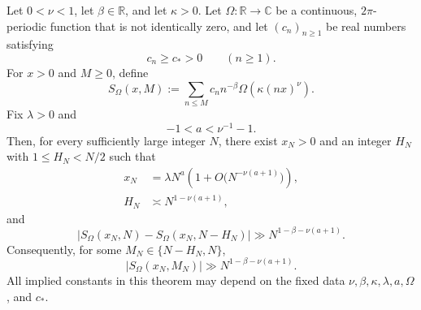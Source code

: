 \documentclass[10pt,a4paper]{amsart}
\newcommand{\C}{\mathbb C}
\newcommand{\R}{\mathbb R}
\begin{document}
\begin{theorem}\label{thm:sector}
Let $0<\nu<1$, let $\beta\in\R$, and let $\kappa>0$.  Let $\Omega:\R\to\C$ be a continuous, $2\pi$-periodic function that is not identically zero, and let $(c_n)_{n\ge1}$ be real numbers satisfying
\begin{equation}\label{eq:coeff-lower}
  c_n\ge c_*>0\qquad(n\ge1).
\end{equation}
For $x>0$ and $M\ge0$, define
\begin{equation}\label{eq:general-S}
  S_{\Omega}(x,M)
  :=\sum_{n\le M}c_n n^{-\beta}
  \Omega\!\left(\kappa(nx)^\nu\right).
\end{equation}
Fix $\lambda>0$ and
\begin{equation}\label{eq:a-general-range}
  -1<a<\nu^{-1}-1.
\end{equation}
Then, for every sufficiently large integer $N$, there exist $x_N>0$ and an integer $H_N$ with $1\le H_N<N/2$ such that
\begin{align}
  x_N
  &=\lambda N^a\left(1+O\bigl(N^{-\nu(a+1)}\bigr)\right),\label{eq:sector-x}\\
  H_N
  &\asymp N^{1-\nu(a+1)},\label{eq:sector-H}
\end{align}
and
\begin{equation}\label{eq:sector-block}
  \bigl|S_{\Omega}(x_N,N)-S_{\Omega}(x_N,N-H_N)\bigr|
  \gg N^{1-\beta-\nu(a+1)}.
\end{equation}
Consequently, for some $M_N\in\{N-H_N,N\}$,
\begin{equation}\label{eq:sector-max}
  |S_{\Omega}(x_N,M_N)|
  \gg N^{1-\beta-\nu(a+1)}.
\end{equation}
All implied constants in this theorem may depend on the fixed data $\nu,\beta,\kappa,\lambda,a,\Omega$, and $c_*$.
\end{theorem}
\end{document}
